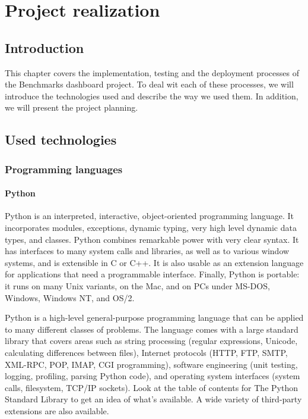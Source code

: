 \chapter{Project realization}
\section*{Introduction}
This chapter covers the implementation, testing and the deployment processes of
the Benchmarks dashboard project. To deal wit each of these processes, we will
introduce the technologies used and describe the way we used them. In
addition, we will present the project planning.
\pagebreak

\section{Used technologies}
\subsection{Programming languages}
\subsubsection{Python}
Python is an interpreted, interactive, object-oriented programming language. It
incorporates modules, exceptions, dynamic typing, very high level dynamic data
types, and classes. Python combines remarkable power with very clear syntax. It
has interfaces to many system calls and libraries, as well as to various window
systems, and is extensible in C or C++. It is also usable as an extension
language for applications that need a programmable interface. Finally, Python is
portable: it runs on many Unix variants, on the Mac, and on PCs under MS-DOS,
Windows, Windows NT, and OS/2.

Python is a high-level general-purpose programming language that can be applied
to many different classes of problems. The language comes with a large standard
library that covers areas such as string processing (regular expressions,
Unicode, calculating differences between files), Internet protocols (HTTP, FTP,
SMTP, XML-RPC, POP, IMAP, CGI programming), software engineering (unit testing,
logging, profiling, parsing Python code), and operating system interfaces
(system calls, filesystem, TCP/IP sockets). Look at the table of contents for
The Python Standard Library to get an idea of what's available. A wide variety
of third-party extensions are also available.\cite{python}


